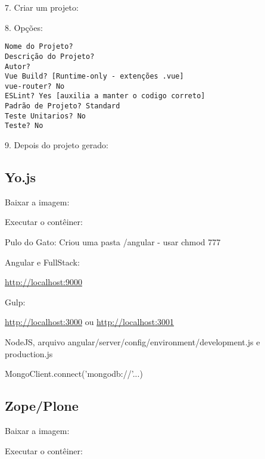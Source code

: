 \documentclass[a4paper,11pt]{article}
\begin{document}
7. Criar um projeto: \\

8. Opções:
\begin{lstlisting}[]
Nome do Projeto?
Descrição do Projeto?
Autor?
Vue Build? [Runtime-only - extenções .vue]
vue-router? No
ESLint? Yes [auxilia a manter o codigo correto]
Padrão de Projeto? Standard
Teste Unitarios? No
Teste? No
\end{lstlisting}

9. Depois do projeto gerado: \\

\subsection{Yo.js}
Baixar a imagem: \\

Executar o contêiner: \\
	
Pulo do Gato: Criou uma pasta /angular - usar chmod 777


Angular e FullStack: \\

\url{http://localhost:9000}

Gulp: 

\url{http://localhost:3000} ou \url{http://localhost:3001}

NodeJS, arquivo angular/server/config/environment/development.js e production.js

MongoClient.connect('mongodb://'...)

\subsection{Zope/Plone}
Baixar a imagem: \\

Executar o contêiner: \\
	
\end{document}
